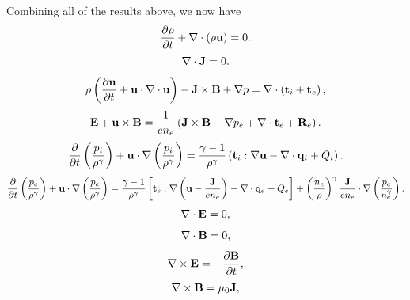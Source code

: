 \documentclass[a4paper,11pt]{report}
\begin{document}
Combining all of the results above, we now have
\begin{equation}
    \label{eq:generalized_MHD_mass}
    \frac{\partial \rho}{\partial t} + \nabla \cdot \left( \rho \mathbf{u} \right) = 0.
\end{equation}
\begin{equation}
    \label{eq:generalized_MHD_div_current}
    \nabla \cdot \mathbf{J} = 0.
\end{equation}
\begin{equation}
    \label{eq:generalized_MHD_vel}
    \rho \left( \frac{\partial \mathbf{u}}{\partial t} + \mathbf{u} \cdot \nabla \cdot \mathbf{u} \right) - \mathbf{J} \times \mathbf{B} + \nabla p = \nabla \cdot \left(  \mathbf{t}_i + \mathbf{t}_e \right),
\end{equation}
\begin{equation}
    \label{eq:generalized_MHD_ohms}
    \mathbf{E} + \mathbf{u} \times \mathbf{B} = \frac{1}{e n_e} \left( \mathbf{J} \times \mathbf{B} - \nabla p_e + \nabla \cdot \mathbf{t}_e + \mathbf{R}_e \right).
\end{equation}
\begin{equation}
    \label{eq:generalized_MHD_pi}
    \frac{\partial}{\partial t} \left( \frac{p_i}{\rho^\gamma} \right) + \mathbf{u} \cdot \nabla \left(\frac{p_i}{\rho^\gamma} \right) = \frac{\gamma - 1}{\rho^\gamma} \left( \mathbf{t}_i : \nabla \mathbf{u} - \nabla \cdot \mathbf{q}_i + Q_i \right).
\end{equation}
\begin{equation}
    \label{eq:generalized_MHD_pe}
    \frac{\partial}{\partial t} \left( \frac{p_e}{\rho^\gamma} \right) + \mathbf{u} \cdot \nabla \left(\frac{p_e}{\rho^\gamma} \right) = \frac{\gamma - 1}{\rho^\gamma} \left[ \mathbf{t}_e : \nabla \left( \mathbf{u} - \frac{\mathbf{J}}{en_e} \right) - \nabla \cdot \mathbf{q}_e + Q_e \right] + \left( \frac{n_e}{\rho} \right)^\gamma \frac{\mathbf{J}}{e n_e} \cdot \nabla \left( \frac{p_e}{n_e^\gamma} \right).
\end{equation}
\begin{equation}
    \label{eq:generalized_MHD_maxwell1}
    \nabla \cdot \mathbf{E} = 0,
\end{equation}
\begin{equation}
    \label{eq:generalized_MHD_maxwell2}
    \nabla \cdot \mathbf{B} = 0,
\end{equation}
\begin{equation}
    \label{eq:generalized_MHD_maxwell3}
    \nabla \times \mathbf{E} = -\frac{ \partial \mathbf{B}}{\partial t},
\end{equation}
\begin{equation}
    \label{eq:generalized_MHD_maxwell4}
    \nabla \times \mathbf{B} = \mu_0 \mathbf{J},
\end{equation}
\end{document}
